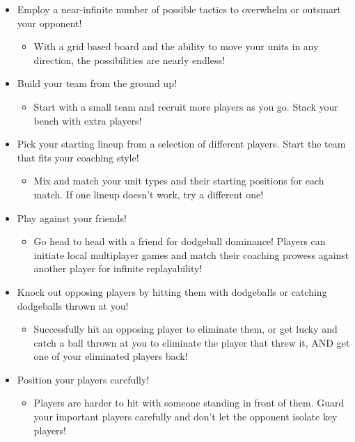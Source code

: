 \documentclass [12pt]{article}
\begin{document}
\begin{itemize}
\item Employ a near-infinite number of possible tactics to overwhelm or outsmart your opponent!
	\begin{itemize}
	\item With a grid based board and the ability to move your units in any direction, the possibilities are nearly endless!
	\end{itemize}

\item Build your team from the ground up!
	\begin{itemize}
	\item Start with a small team and recruit more players as you go. Stack your bench with extra players!
	\end{itemize}

\item Pick your starting lineup from a selection of different players. Start the team that fits your coaching style!
	\begin{itemize}
	\item Mix and match your unit types and their starting positions for each match. If one lineup doesn't work, try a different one!
	\end{itemize}

\item Play against your friends!
	\begin{itemize}
	\item Go head to head with a friend for dodgeball dominance! Players can initiate local multiplayer games and match their coaching prowess against another player for infinite replayability!
	\end{itemize}

\item Knock out opposing players by hitting them with dodgeballs or catching dodgeballs thrown at you!
	\begin{itemize}
	\item Successfully hit an opposing player to eliminate them, or get lucky and catch a ball thrown at you to eliminate the player that threw it, AND get one of your eliminated players back!
	\end{itemize}

\item Position your players carefully!
	\begin{itemize}
	\item Players are harder to hit with someone standing in front of them. Guard your important players carefully and don't let the opponent isolate key players!
	\end{itemize}


\end{itemize}
\end{document}
